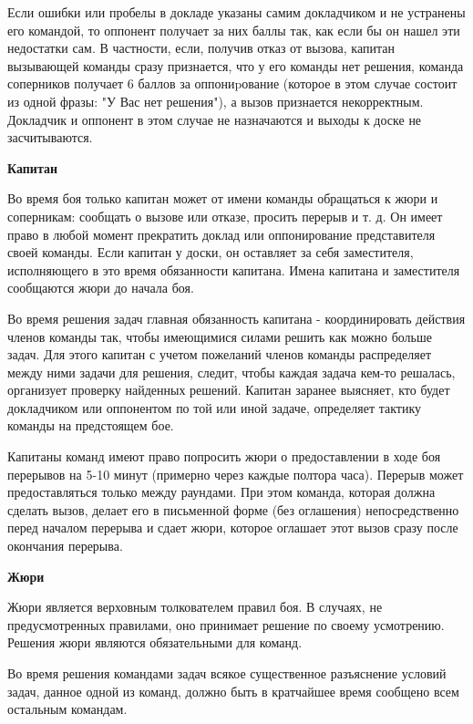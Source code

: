 \documentclass{article}
\begin{document}
Если ошибки или пробелы в докладе указаны самим докладчиком и не устранены его командой, то оппонент получает за них баллы так, как если бы он нашел эти недостатки сам. В частности, если, получив отказ от вызова, капитан вызывающей команды сразу признается, что у его команды нет решения, команда соперников получает 6 баллов за оппониpование (которое в этом случае состоит из одной фразы: "У Вас нет решения"), а вызов признается некорректным. Докладчик и оппонент в этом случае не назначаются и выходы к доске не засчитываются.

\begin{center}
\textbf{Капитан}
\end{center}

Во время боя только капитан может от имени команды обращаться к жюри и соперникам: сообщать о вызове или отказе, просить перерыв и т. д. Он имеет право в любой момент прекратить доклад или оппонирование представителя своей команды. Если капитан у доски, он оставляет за себя заместителя, исполняющего в это время обязанности капитана. Имена капитана и заместителя сообщаются жюри до начала боя.

Во время решения задач главная обязанность капитана - координировать действия членов команды так, чтобы имеющимися силами решить как можно больше задач. Для этого капитан с учетом пожеланий членов команды распределяет между ними задачи для решения, следит, чтобы каждая задача кем-то решалась, организует проверку найденных решений. Капитан заранее выясняет, кто будет докладчиком или оппонентом по той или иной задаче, определяет тактику команды на предстоящем бое.

Капитаны команд имеют право попросить жюри о предоставлении в ходе боя перерывов на 5-10 минут (примерно через каждые полтора часа). Перерыв может предоставляться только между раундами. При этом команда, которая должна сделать вызов, делает его в письменной форме (без оглашения) непосредственно перед началом перерыва и сдает жюри, которое оглашает этот вызов сразу после окончания перерыва.

\begin{center}
\textbf{Жюри}
\end{center}

Жюри является верховным толкователем правил боя. В случаях, не предусмотренных правилами, оно принимает решение по своему усмотрению. Решения жюри являются обязательными для команд.

Во время решения командами задач всякое существенное разъяснение условий задач, данное одной из команд, должно быть в кратчайшее время сообщено всем остальным командам.
\end{document}
